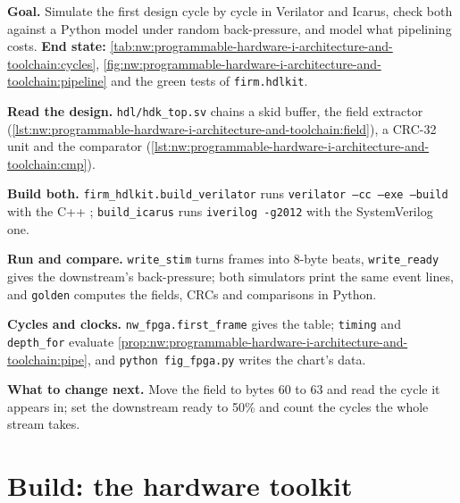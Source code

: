 \begin{tutorial}
\textbf{Goal.} Simulate the first design cycle by cycle in Verilator and Icarus, check both against a Python model under random
back-pressure, and model what pipelining costs. \textbf{End state:} \cref{tab:nw:programmable-hardware-i-architecture-and-toolchain:cycles},
\cref{fig:nw:programmable-hardware-i-architecture-and-toolchain:pipeline} and the green tests of \texttt{firm.hdlkit}.
\begin{tutsteps}
\item \textbf{Read the design.} \texttt{hdl/hdk\_top.sv} chains a skid buffer, the field extractor
  (\cref{lst:nw:programmable-hardware-i-architecture-and-toolchain:field}), a CRC-32 unit and the comparator
  (\cref{lst:nw:programmable-hardware-i-architecture-and-toolchain:cmp}).
\item \textbf{Build both.} \texttt{firm\_hdlkit.build\_verilator} runs \texttt{verilator --cc --exe --build} with the C++ ;
  \texttt{build\_icarus} runs \texttt{iverilog -g2012} with the SystemVerilog one.
\item \textbf{Run and compare.} \texttt{write\_stim} turns frames into 8-byte beats, \texttt{write\_ready} gives the downstream's
  back-pressure; both simulators print the same event lines, and \texttt{golden} computes the fields, CRCs and comparisons in Python.
\item \textbf{Cycles and clocks.} \texttt{nw\_fpga.first\_frame} gives the table; \texttt{timing} and \texttt{depth\_for} evaluate
  \cref{prop:nw:programmable-hardware-i-architecture-and-toolchain:pipe}, and \texttt{python fig\_fpga.py} writes the chart's data.
\end{tutsteps}
\textbf{What to change next.} Move the field to bytes 60 to 63 and read the cycle it appears in; set the downstream ready to 50\% and count
the cycles the whole stream takes.
\end{tutorial}

\section{Build: the hardware toolkit}\label{bld:nw:programmable-hardware-i-architecture-and-toolchain:hdlkit}

